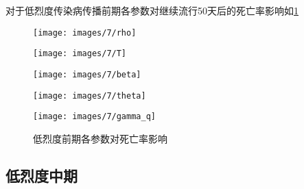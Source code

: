 \documentclass[withoutpreface,bwprint]{cumcmthesis}
\begin{document}
对于低烈度传染病传播前期各参数对继续流行50天后的死亡率影响如\cref{fig:12}
\begin{figure}[H]
    \centering
    \begin{minipage}[c]{0.3\textwidth}
        \centering
        \texttt{[image: images/7/rho]}
        \subcaption{$\rho$}
    \end{minipage}
    \begin{minipage}[c]{0.3\textwidth}
        \centering
        \texttt{[image: images/7/T]}
    \end{minipage}
    \begin{minipage}[c]{0.3\textwidth}
        \centering
        \texttt{[image: images/7/beta]}
        \subcaption{$\beta$}
    \end{minipage}

    \begin{minipage}[c]{0.3\textwidth}
        \centering
        \texttt{[image: images/7/theta]}
        \subcaption{$\theta$}
    \end{minipage}
    \begin{minipage}[c]{0.3\textwidth}
        \centering
        \texttt{[image: images/7/gamma\_q]}
    \end{minipage}
    \caption{低烈度前期各参数对死亡率影响}
    \label{fig:12}

\end{figure}

\subsection{低烈度中期}
\end{document}
